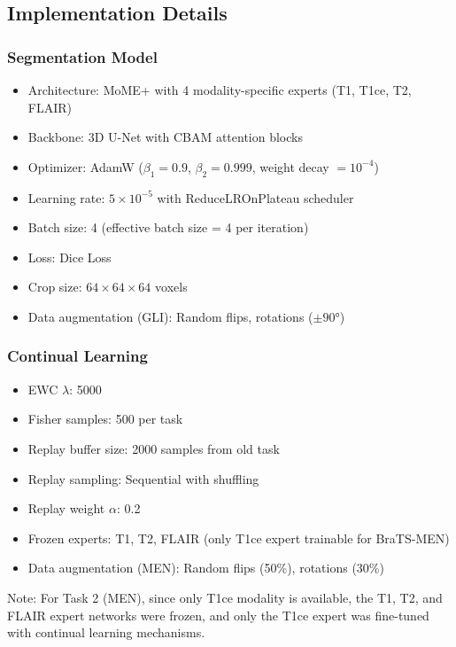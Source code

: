\documentclass[conference]{IEEEtran}
\begin{document}
\subsection{Implementation Details}

\subsubsection{Segmentation Model}

\begin{itemize}
\item Architecture: MoME+ with 4 modality-specific experts (T1, T1ce, T2, FLAIR)
\item Backbone: 3D U-Net with CBAM attention blocks
\item Optimizer: AdamW ($\beta_1=0.9$, $\beta_2=0.999$, weight decay $=10^{-4}$)
\item Learning rate: $5 \times 10^{-5}$ with ReduceLROnPlateau scheduler
\item Batch size: 4 (effective batch size = 4 per iteration)
\item Loss: Dice Loss
\item Crop size: $64 \times 64 \times 64$ voxels
\item Data augmentation (GLI): Random flips, rotations ($\pm 90°$)
\end{itemize}

\subsubsection{Continual Learning}

\begin{itemize}
\item EWC $\lambda$: 5000
\item Fisher samples: 500 per task
\item Replay buffer size: 2000 samples from old task
\item Replay sampling: Sequential with shuffling
\item Replay weight $\alpha$: 0.2
\item Frozen experts: T1, T2, FLAIR (only T1ce expert trainable for BraTS-MEN)
\item Data augmentation (MEN): Random flips (50\%), rotations (30\%)
\end{itemize}

Note: For Task 2 (MEN), since only T1ce modality is available, the T1, T2, and FLAIR expert networks were frozen, and only the T1ce expert was fine-tuned with continual learning mechanisms.
\end{document}
